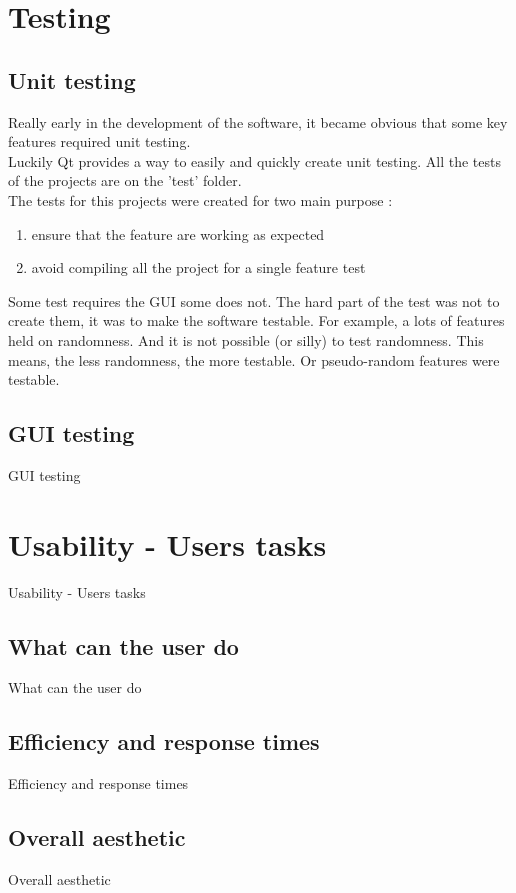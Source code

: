 \documentclass[12pt]{report}
\begin{document}
\part{Testing}

\chapter{Unit testing}
Really early in the development of the software, it became obvious that some key features required unit testing.\\
Luckily Qt provides a way to easily and quickly create unit testing. All the tests of the projects are on the 'test' folder.\\
The tests for this projects were created for two main purpose :
\begin{enumerate}
	\item ensure that the feature are working as expected
	\item avoid compiling all the project for a single feature test
\end{enumerate}
Some test requires the GUI some does not. The hard part of the test was not to create them, it was to make the software testable. For example, a lots of features held on randomness. And it is not possible (or silly) to test randomness. This means, the less randomness, the more testable. Or pseudo-random features were testable.

\chapter{GUI testing}
GUI testing

\part{Usability - Users tasks}
Usability - Users tasks

\chapter{What can the user do}
What can the user do


\chapter{Efficiency and response times}
Efficiency and response times

\chapter{Overall aesthetic}
Overall aesthetic
\end{document}
